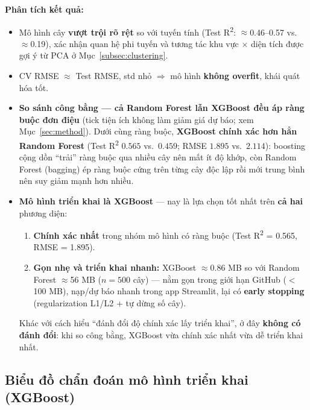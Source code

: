 \textbf{Phân tích kết quả:}
\begin{itemize}[leftmargin=*, itemsep=3pt]
  \item Mô hình cây \textbf{vượt trội rõ rệt} so với tuyến tính
        (Test R\textsuperscript{2}: $\approx$0.46--0.57 vs.\ $\approx$0.19),
        xác nhận quan hệ phi tuyến và tương tác khu vực $\times$ diện tích
        được gợi ý từ PCA ở Mục~\ref{subsec:clustering}.
  \item CV RMSE $\approx$ Test RMSE, std nhỏ $\Rightarrow$ mô hình \textbf{không overfit},
        khái quát hóa tốt.
  \item \textbf{So sánh công bằng — cả Random Forest lẫn XGBoost đều áp ràng buộc đơn điệu}
        (tick tiện ích không làm giảm giá dự báo; xem Mục~\ref{sec:method}). Dưới cùng ràng buộc,
        \textbf{XGBoost chính xác hơn hẳn Random Forest} (Test R\textsuperscript{2} $0.565$ vs.\
        $0.459$; RMSE $1.895$ vs.\ $2.114$): boosting cộng dồn ``trải'' ràng buộc qua nhiều cây nên
        mất ít độ khớp, còn Random Forest (bagging) ép ràng buộc cứng trên từng cây độc lập rồi mới
        trung bình nên suy giảm mạnh hơn nhiều.
  \item \textbf{Mô hình triển khai là XGBoost} — nay là lựa chọn tốt nhất trên \textbf{cả hai}
        phương diện:
        \begin{enumerate}[leftmargin=1.2em, itemsep=1pt, topsep=2pt]
          \item \textbf{Chính xác nhất} trong nhóm mô hình có ràng buộc (Test R\textsuperscript{2}
                = 0.565, RMSE = 1.895).
          \item \textbf{Gọn nhẹ và triển khai nhanh:} XGBoost $\approx$0.86 MB so với Random Forest
                $\approx$56 MB ($n=500$ cây) — nằm gọn trong giới hạn GitHub ($<$100 MB), nạp/dự báo
                nhanh trong app Streamlit, lại có \textbf{early stopping} (regularization L1/L2 + tự
                dừng số cây).
        \end{enumerate}
        Khác với cách hiểu ``đánh đổi độ chính xác lấy triển khai'', ở đây \textbf{không có đánh
        đổi}: khi so công bằng, XGBoost vừa chính xác nhất vừa dễ triển khai nhất.
\end{itemize}

\subsection{Biểu đồ chẩn đoán mô hình triển khai (XGBoost)}
\label{subsec:diagnostics}

